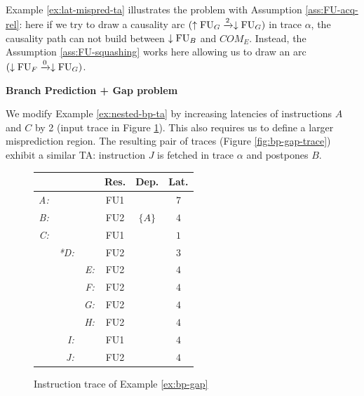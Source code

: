 Example \ref{ex:lat-mispred-ta} illustrates the problem with Assumption \ref{ass:FU-acq-rel}:  here if we try to draw a causality arc $(\uparrow\mathrm{FU}_G \xrightarrow{2} \downarrow\mathrm{FU}_G)$ in trace $\alpha$, the causality path can not build between $\downarrow\mathrm{FU}_B$ and $COM_E$. Instead, the Assumption \ref{ass:FU-squashing} works here allowing us to draw an arc $(\downarrow\mathrm{FU}_F \xrightarrow{0} \downarrow\mathrm{FU}_G)$.



\begin{example}
\textbf{Branch Prediction + Gap problem}

We modify Example \ref{ex:nested-bp-ta} by increasing latencies of instructions $A$ and $C$ by 2 (input trace in Figure \ref{fig:bp-gap-input}). This also requires us to define a larger misprediction region. The resulting pair of traces (Figure \ref{fig:bp-gap-trace}) exhibit a similar TA: instruction $J$ is fetched in trace $\alpha$ and postpones $B$.

\label{ex:bp-gap}
\end{example}

\begin{figure}[H]
    \centering
    \begin{tabular}{rrr|ccc}
    &  &  & Res. & Dep. & Lat. \\ \hline
    \textit{A:} &  &  & FU1 &  & $7$ \\
    \textit{B:} &  &  & FU2 & $\{A\}$ & $4$ \\
    \textit{C:} &  &  & FU1 &  & $1$ \\
    & \textit{*D:} &  & FU2 &  & $3$ \\
    &  & \textit{E:} & FU2 &  & $4$ \\
    &  & \textit{F:} & FU2 &  & $4$ \\
    &  & \textit{G:} & FU2 &  & $4$ \\
    &  & \textit{H:} & FU2 &  & $4$ \\
    & \textit{I:} &  & FU1 &  & $4$ \\
    & \textit{J:} &  & FU2 &  & $4$ \\
    \end{tabular}    

    \caption{Instruction trace of Example \ref{ex:bp-gap}}
    \label{fig:bp-gap-input}
\end{figure}

